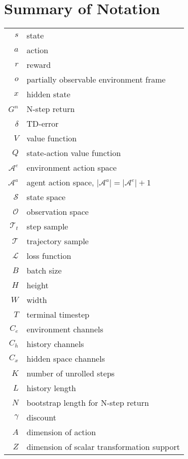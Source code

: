 \section{Summary of Notation}

\begin{tabular}{| r | l |}
    $s$ & state  \\
    $a$ & action \\
    $r$ & reward \\
    $o$ & partially observable environment frame \\
    $x$ & hidden state \\
    $G^n$ & N-step return \\
    $\delta$ & TD-error \\
    $V$ & value function \\
    $Q$ & state-action value function \\
    $\mathcal{A}^e$ & environment action space \\
    $\mathcal{A}^a$ & agent action space, $ | \mathcal{A}^a | = | \mathcal{A}^e | + 1$ \\
    $\mathcal{S}$ & state space \\
    $\mathcal{O}$ & observation space \\
    $\mathcal{T}_t$ & step sample \\
    $\mathcal{T}$ & trajectory sample \\
    $\mathcal{L}$ & loss function \\

    \hline

    
    \hline
    $B$ & batch size\\
    $H$ & height \\
    $W$ & width \\
    $T$ & terminal timestep \\
    $C_e$ & environment channels \\
    $C_h$ & history channels \\
    $C_x$ & hidden space channels \\
    $K$ & number of unrolled steps \\
    $L$ & history length \\
    $N$ & bootstrap length for N-step return \\
    $\gamma$ & discount \\
    $A$ & dimension of action \\
    $Z$ & dimension of scalar transformation support \\


\end{tabular}
